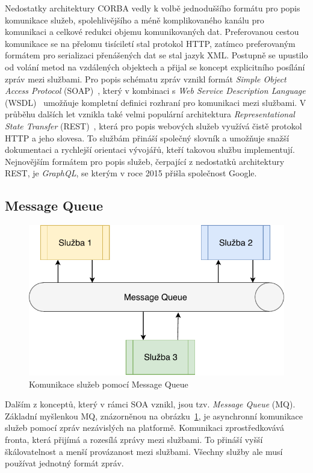 Nedostatky architektury CORBA vedly k volbě jednoduššího
formátu pro popis komunikace služeb, spolehlivějšího a méně
komplikovaného kanálu pro komunikaci a celkové redukci
objemu komunikovaných dat. Preferovanou cestou komunikace
se na přelomu tisíciletí stal protokol HTTP, zatímco preferovaným formátem
pro serializaci přenášených dat se stal jazyk XML.
Postupně se upustilo od volání metod na vzdálených objektech a přijal
se koncept explicitního posílání zpráv mezi službami.
Pro popis schématu zpráv vznikl formát \textit{Simple Object Access
Protocol} (SOAP)~\cite{box2000simple}, který v kombinaci s
\textit{Web Service Description Language} (WSDL)~\cite{christensen2001web}
umožňuje kompletní definici rozhraní pro komunikaci mezi službami.
V průběhu dalších let vznikla také velmi populární architektura
\textit{Representational State Transfer} (REST)~\cite{fielding2000rest},
která pro popis webových služeb využívá čistě protokol HTTP a jeho slovesa.
To službám přináší společný slovník a umožňuje snažší dokumentaci
a rychlejší orientaci vývojářů, kteří takovou službu implementují. Nejnovějším
formátem pro popis služeb, čerpající z nedostatků architektury REST, je
\textit{GraphQL}, se kterým v roce 2015 přišla společnost Google.

\subsection{Message Queue}

\begin{figure}
    \centering
    \includegraphics[keepaspectratio=true, width=0.5\linewidth]{figures/message-queue.pdf}
    \caption{Komunikace služeb pomocí Message Queue}
    \label{fig:message-queue}
\end{figure}

Dalším z konceptů, který v rámci SOA vznikl, jsou tzv. \textit{Message Queue} (MQ).
Základní myšlenkou MQ, znázorněnou na obrázku~\ref{fig:message-queue},
je asynchronní komunikace služeb pomocí zpráv nezávislých
na platformě. Komunikaci zprostředkovává fronta, která přijímá a rozesílá
zprávy mezi službami. To přináší vyšší škálovatelnost a menší provázanost
mezi službami. Všechny služby ale musí používat jednotný formát zpráv.


